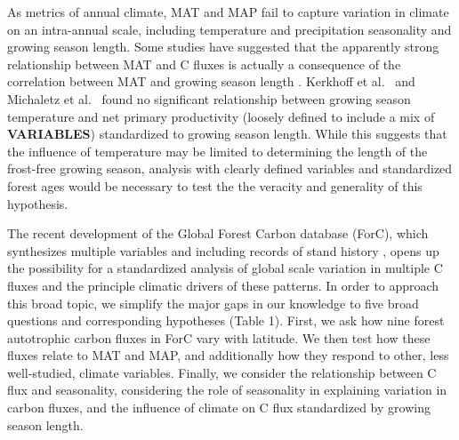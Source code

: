 \documentclass[
]{article}
\begin{document}
As metrics of annual climate, MAT and MAP fail to capture variation in
climate on an intra-annual scale, including temperature and
precipitation seasonality and growing season length. Some studies have
suggested that the apparently strong relationship between MAT and C
fluxes is actually a consequence of the correlation between MAT and
growing season length
\citep{kerkhoff_plant_2005, michaletz_convergence_2014, michaletz_drivers_2018}.
Kerkhoff et al.~\citeyearpar{kerkhoff_plant_2005} and Michaletz et
al.~\citeyearpar{michaletz_convergence_2014} found no significant
relationship between growing season temperature and net primary
productivity (loosely defined to include a mix of \textbf{VARIABLES})
standardized to growing season length. While this suggests that the
influence of temperature may be limited to determining the length of the
frost-free growing season, analysis with clearly defined variables and
standardized forest ages would be necessary to test the the veracity and
generality of this hypothesis.

The recent development of the Global Forest Carbon database (ForC),
which synthesizes multiple variables and including records of stand
history
\citep{anderson-teixeira_carbon_2016, anderson-teixeira_forc_2018},
opens up the possibility for a standardized analysis of global scale
variation in multiple C fluxes and the principle climatic drivers of
these patterns. In order to approach this broad topic, we simplify the
major gaps in our knowledge to five broad questions and corresponding
hypotheses (Table 1). First, we ask how nine forest autotrophic carbon
fluxes in ForC vary with latitude. We then test how these fluxes relate
to MAT and MAP, and additionally how they respond to other, less
well-studied, climate variables. Finally, we consider the relationship
between C flux and seasonality, considering the role of seasonality in
explaining variation in carbon fluxes, and the influence of climate on C
flux standardized by growing season length.

\renewcommand{\arraystretch}{2}
\end{document}
